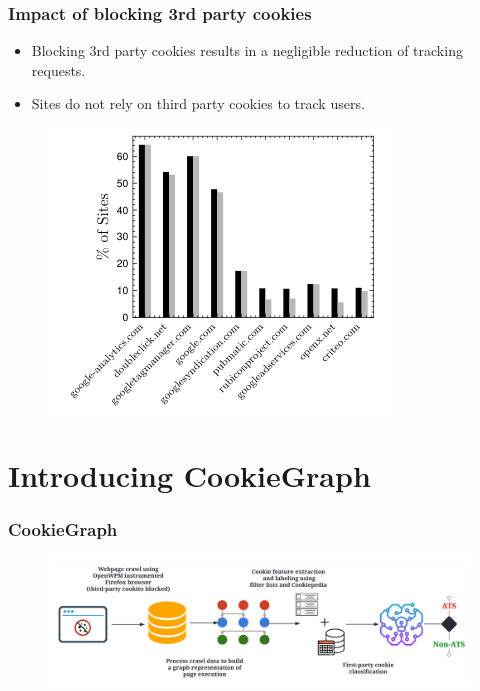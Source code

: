 \documentclass{beamer}
\begin{document}
\begin{frame}
\frametitle{Impact of blocking 3rd party cookies}

\begin{itemize}
\item Blocking 3rd party cookies results in a negligible reduction of tracking requests.
\item Sites do not rely on third party cookies to track users.
\end{itemize}

\begin{figure}
\includegraphics[scale=0.5]{img/trackingwhen3rdpcblock}
\end{figure}
\end{frame}



\section{Introducing CookieGraph}

\begin{frame}
\frametitle{CookieGraph}

\begin{figure}
\includegraphics[scale=0.2]{img/diagram}
\end{figure}

\end{frame}
\end{document}
